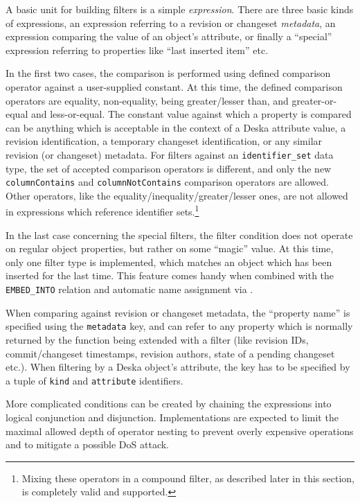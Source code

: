 \documentclass[deska]{subfiles}
\begin{document}
A basic unit for building filters is a simple {\em expression}.  There are three basic kinds of expressions, an expression
referring to a revision or changeset {\em metadata}, an expression comparing the value of an object's attribute, or
finally a ``special'' expression referring to properties like ``last inserted item'' etc.

In the first two cases, the comparison is performed using defined comparison operator against a user-supplied constant.
At this time, the defined comparison operators are equality, non-equality, being greater/lesser than, and
greater-or-equal and less-or-equal.  The constant value against which a property is compared can be anything which is
acceptable in the context of a Deska attribute value, a revision identification, a temporary changeset identification,
or any similar revision (or changeset) metadata.  For filters against an {\tt identifier\_set} data type, the set of
accepted comparison operators is different, and only the new {\tt columnContains} and {\tt columnNotContains} comparison
operators are allowed.  Other operators, like the equality/inequality/greater/lesser ones, are not allowed in
expressions which reference identifier sets.\footnote{Mixing these operators in a compound filter, as described later in
this section, is completely valid and supported.}

In the last case concerning the special filters, the filter condition does not operate on regular object properties, but
rather on some ``magic'' value.  At this time, only one filter type is implemented, which matches an object which has
been inserted for the last time.  This feature comes handy when combined with the {\tt EMBED\_INTO} relation and
automatic name assignment via .

When comparing against revision or changeset metadata, the ``property name'' is specified using the {\tt metadata} key,
and can refer to any property which is normally returned by the function being extended with a filter (like revision
IDs, commit/changeset timestamps, revision authors, state of a pending changeset etc.).  When filtering by a Deska
object's attribute, the key has to be specified by a tuple of {\tt kind} and {\tt attribute} identifiers.

More complicated conditions can be created by chaining the expressions into logical conjunction and disjunction.
Implementations are expected to limit the maximal allowed depth of operator nesting to prevent overly expensive
operations and to mitigate a possible DoS attack.
\end{document}
